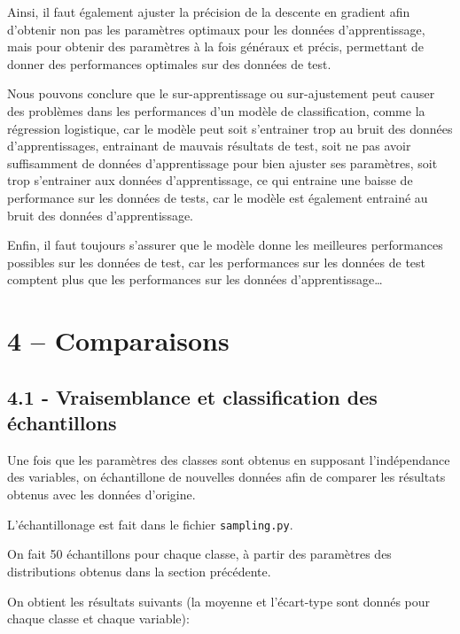 \documentclass[
]{article}
\begin{document}
Ainsi, il faut également ajuster la précision de la descente en gradient
afin d'obtenir non pas les paramètres optimaux pour les données
d'apprentissage, mais pour obtenir des paramètres à la fois généraux et
précis, permettant de donner des performances optimales sur des données
de test.

Nous pouvons conclure que le sur-apprentissage ou sur-ajustement peut
causer des problèmes dans les performances d'un modèle de
classification, comme la régression logistique, car le modèle peut soit
s'entrainer trop au bruit des données d'apprentissages, entrainant de
mauvais résultats de test, soit ne pas avoir suffisamment de données
d'apprentissage pour bien ajuster ses paramètres, soit trop s'entrainer
aux données d'apprentissage, ce qui entraine une baisse de performance
sur les données de tests, car le modèle est également entrainé au bruit
des données d'apprentissage.

Enfin, il faut toujours s'assurer que le modèle donne les meilleures
performances possibles sur les données de test, car les performances sur
les données de test comptent plus que les performances sur les données
d'apprentissage\ldots{}

\newpage{}

\hypertarget{comparaisons}{%
\section{4 -- Comparaisons}\label{comparaisons}}

\hypertarget{vraisemblance-et-classification-des-uxe9chantillons}{%
\subsection{4.1 - Vraisemblance et classification des
échantillons}\label{vraisemblance-et-classification-des-uxe9chantillons}}

Une fois que les paramètres des classes sont obtenus en supposant
l'indépendance des variables, on échantillone de nouvelles données afin
de comparer les résultats obtenus avec les données d'origine.

L'échantillonage est fait dans le fichier \texttt{sampling.py}.

On fait 50 échantillons pour chaque classe, à partir des paramètres des
distributions obtenus dans la section précédente.

On obtient les résultats suivants (la moyenne et l'écart-type sont
donnés pour chaque classe et chaque variable):
\end{document}
